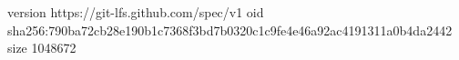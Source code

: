 version https://git-lfs.github.com/spec/v1
oid sha256:790ba72cb28e190b1c7368f3bd7b0320c1c9fe4e46a92ac4191311a0b4da2442
size 1048672
